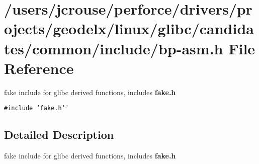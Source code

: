 \section{/users/jcrouse/perforce/drivers/projects/geodelx/linux/glibc/candidates/common/include/bp-asm.h File Reference}
\label{bp-asm_8h}
fake include for glibc derived functions, includes {\bf fake.h} 


{\tt \#include \char`\"{}fake.h\char`\"{}}\par


\subsection{Detailed Description}
fake include for glibc derived functions, includes {\bf fake.h}



